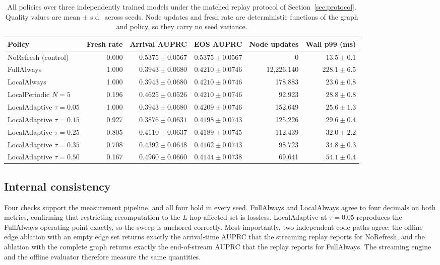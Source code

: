 \documentclass[conference]{IEEEtran}
\begin{document}
\begin{table}[t]
\centering
\caption{All policies over three independently trained models under the matched
replay protocol of Section~\ref{sec:protocol}. Quality values are mean $\pm$
s.d.\ across seeds. Node updates and fresh rate are deterministic functions of
the graph and policy, so they carry no seed variance.}
\label{tab:main}
\small
\begin{tabular}{@{}lrrrrr@{}}
\toprule
Policy & Fresh rate & Arrival AUPRC & EOS AUPRC & Node updates & Wall p99 (ms) \\
\midrule
NoRefresh (control)             & 0.000 & $\mathbf{0.5375 \pm 0.0567}$ & $\mathbf{0.5375 \pm 0.0567}$ & 0 & $13.5 \pm 0.1$ \\
FullAlways                      & 1.000 & $0.3943 \pm 0.0680$ & $0.4210 \pm 0.0746$ & 12{,}226{,}140 & $228.1 \pm 6.5$ \\
LocalAlways                     & 1.000 & $0.3943 \pm 0.0680$ & $0.4210 \pm 0.0746$ & 178{,}883 & $23.6 \pm 0.8$ \\
LocalPeriodic $N{=}5$           & 0.196 & $0.4625 \pm 0.0526$ & $0.4210 \pm 0.0746$ & 92{,}923 & $28.8 \pm 0.8$ \\
LocalAdaptive $\tau{=}0.05$     & 1.000 & $0.3943 \pm 0.0680$ & $0.4209 \pm 0.0746$ & 152{,}649 & $25.6 \pm 1.3$ \\
LocalAdaptive $\tau{=}0.15$     & 0.927 & $0.3876 \pm 0.0631$ & $0.4198 \pm 0.0743$ & 125{,}226 & $29.6 \pm 0.4$ \\
LocalAdaptive $\tau{=}0.25$     & 0.805 & $0.4110 \pm 0.0637$ & $0.4189 \pm 0.0745$ & 112{,}439 & $32.0 \pm 2.2$ \\
LocalAdaptive $\tau{=}0.35$     & 0.708 & $0.4392 \pm 0.0648$ & $0.4162 \pm 0.0743$ & 98{,}723 & $34.8 \pm 0.3$ \\
LocalAdaptive $\tau{=}0.50$     & 0.167 & $0.4960 \pm 0.0660$ & $0.4144 \pm 0.0738$ & 69{,}641 & $54.1 \pm 0.4$ \\
\bottomrule
\end{tabular}
\end{table}

\subsection{Internal consistency}
\label{sec:consistency}

Four checks support the measurement pipeline, and all four hold in every seed.
FullAlways and LocalAlways agree to four decimals on both metrics, confirming
that restricting recomputation to the $L$-hop affected set is lossless.
LocalAdaptive at $\tau{=}0.05$ reproduces the FullAlways operating point
exactly, so the sweep is anchored correctly. Most importantly, two independent
code paths agree: the offline edge ablation with an empty edge set returns
exactly the arrival-time AUPRC that the streaming replay reports for NoRefresh,
and the ablation with the complete graph returns exactly the end-of-stream
AUPRC that the replay reports for FullAlways. The streaming engine and the
offline evaluator therefore measure the same quantities.
\end{document}
